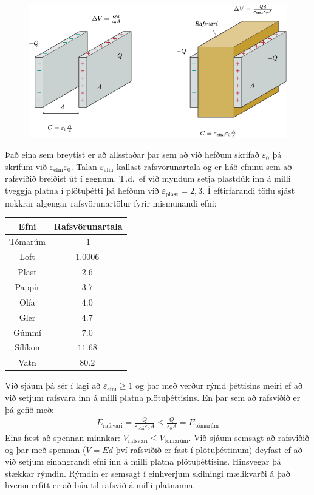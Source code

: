 \begin{figure}[ht]
    \centering
    \includegraphics{figures/rafsvari.pdf}
\end{figure}

Það eina sem breytist er að allsstaðar þar sem að við hefðum skrifað $\varepsilon_0$ þá skrifum við $\varepsilon_{\text{efni}} \varepsilon_0$. Talan $\varepsilon_{\text{efni}}$ kallast rafsvörunartala og er háð efninu sem að rafsviðið breiðist út í gegnum. T.d.~ef við myndum setja plastdúk inn á milli tveggja platna í plötuþétti þá hefðum við $\varepsilon_{\text{plast}} = 2,3$. Í eftirfarandi töflu sjást nokkrar algengar rafsvörunartölur fyrir mismunandi efni:

\begin{table}[ht]
    \centering
    \begin{tabular}{|c|c|}
    \hline
        \textbf{Efni} & \textbf{Rafsvörunartala} \\ \hline \hline
        Tómarúm & $1$ \\ \hline
        Loft & $\SI{1.0006}{}$ \\ \hline
        Plast & $\SI{2.6}{}$ \\ \hline
        Pappír & $\SI{3.7}{}$ \\ \hline
        Olía & $\SI{4.0}{}$ \\ \hline
        Gler & $\SI{4.7}{}$ \\ \hline
        Gúmmí & $\SI{7.0}{}$ \\ \hline
        Sílíkon & $\SI{11.68}{}$ \\ \hline
        Vatn & $\SI{80.2}{}$ \\ \hline
    \end{tabular}
\end{table}
Við sjáum þá sér í lagi að $\varepsilon_{\text{efni}} \geq 1$ og þar með verður rýmd þéttisins meiri ef að við setjum rafsvara inn á milli platna plötuþéttisins. En þar sem að rafsviðið er þá gefið með:
\begin{align*}
    E_{\text{rafsvari}} = \frac{Q}{ \varepsilon_{\text{efni}} \varepsilon_0 A} \leq \frac{Q}{ \varepsilon_0 A} = E_{\text{tómarúm}}
\end{align*}
Eins fæst að spennan minnkar: $V_{\text{rafsvari}} \leq V_{\text{tómarúm}}$. Við sjáum semsagt að rafsviðið og þar með spennan ($V = Ed$ því rafsviðið er fast í plötuþéttinum) deyfast ef að við setjum einangrandi efni inn á milli platna plötuþéttisins. Hinsvegar þá stækkar rýmdin. Rýmdin er semsagt í einhverjum skilningi mælikvarði á það hversu erfitt er að búa til rafsvið á milli platnanna.




